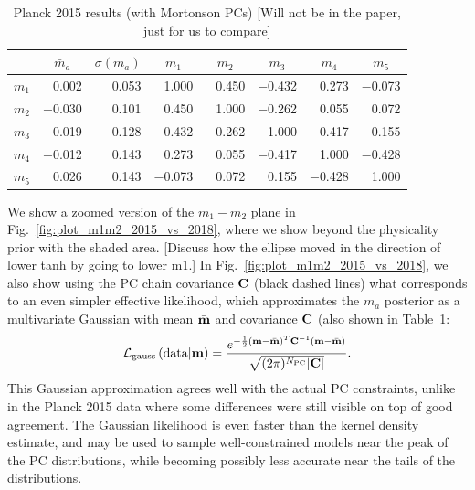 \documentclass[prd,twocolumn,amsmath,amssymb,floatfix,superscriptaddress,nofootinbib]{revtex4-1}
\begin{document}
\begin{table}[b]
\centering
\caption{Planck 2015 results (with Mortonson PCs) [Will not be in the paper, just for us to compare] }
\label{tab:PC_stats}
\begin{tabular}{|r | r r@{\hskip 0.06in}|r r r r r|}
\hline
		
			  &  \multicolumn{1}{c}{$\bar m_a$} & \multicolumn{1}{c}{$\sigma(m_a)$}	 & \multicolumn{1}{|c}{$m_1$} & \multicolumn{1}{c}{$m_2$} & \multicolumn{1}{c}{$m_3$} & \multicolumn{1}{c}{$m_4$} & \multicolumn{1}{c|}{$m_5$} 
		\\ \hline

$m_1$ 
	& 0.002 & 0.053 & 1.000 & 0.450 & $-$0.432 & 0.273 & $-$0.073 \\ 
$m_2$ 
	& $-$0.030 &  0.101 & 0.450 & 1.000 & $-$0.262 & 0.055 & 0.072 \\ 
$m_3$ 
	& 0.019 &  0.128 & $-$0.432 & $-$0.262 &1.000 & $-$0.417 & 0.155 \\
$m_4$  
	& $-$0.012 & 0.143 &  0.273 & 0.055 & $-$0.417 & 1.000 & $-$0.428 \\ 
$m_5$ 
	& 0.026 & 0.143 & $-$0.073 & 0.072 & 0.155 & $-$0.428 & 1.000\\ 
\hline
\end{tabular}
\end{table}


We show a zoomed version of the $m_1-m_2$ plane in Fig.~\ref{fig:plot_m1m2_2015_vs_2018}, where we show beyond the physicality prior with the shaded area. [Discuss how the ellipse moved in the direction of lower tanh by going to lower m1.] 
In Fig.~\ref{fig:plot_m1m2_2015_vs_2018}, we also show using the PC chain covariance $\bf C$ (black dashed lines) what corresponds to an even simpler effective likelihood, which approximates the $m_a$ posterior as a multivariate Gaussian with mean $\bar{\bf m}$ and covariance $\bf C$ (also shown in Table~\ref{tab:PC_stats}:
\begin{equation}
 {\cal L}_{\rm gauss}\left({\rm data}|\mathbf{m} \right) = \frac{ e^{-\frac{1}{2} ({\bf m}-\bar{\bf m})^T {\bf C}^{-1} ({\bf m}-\bar{\bf m}) } }{\sqrt{(2\pi)^{N_{\rm PC}} | \mathbf{C}| }}.
 \label{eq:gaussian}
 \end{equation}
 This Gaussian approximation agrees well with the actual PC constraints, unlike in the Planck 2015 data where some differences were still visible on top of good agreement. The Gaussian likelihood is even faster than the kernel density estimate, and may be used to sample well-constrained models near the peak of the PC distributions, while becoming possibly less accurate near the tails of the distributions.
\end{document}

